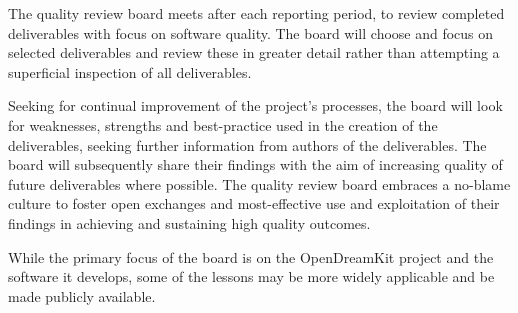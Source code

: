 \documentclass{deliverablereport}
\begin{document}
The quality review board meets after each reporting period, to review
completed deliverables with focus on software quality. The board will choose
and focus on selected deliverables and review these in greater detail
rather than attempting a superficial inspection of all deliverables.

Seeking for continual improvement of the project's processes, the
board will look for weaknesses, strengths and best-practice used in
the creation of the deliverables, seeking further information from
authors of the deliverables. The board will subsequently share their
findings with the aim of increasing quality of future deliverables
where possible. The quality review board embraces a no-blame culture
to foster open exchanges and most-effective use and exploitation of
their findings in achieving and sustaining high quality outcomes.

While the primary focus of the board is on the OpenDreamKit project
and the software it develops,
some of the lessons may be more widely applicable and be made publicly
available.






\end{document}

